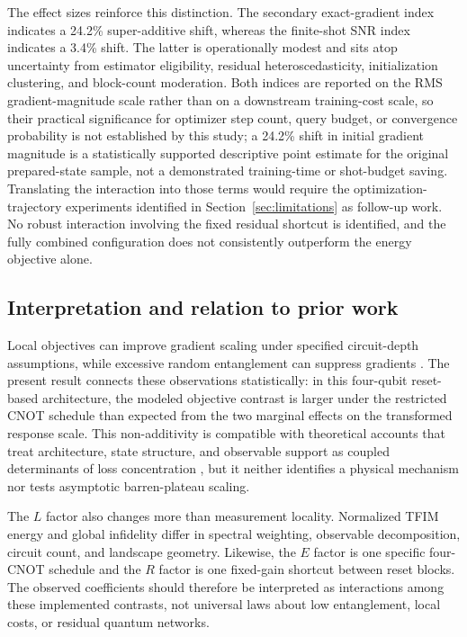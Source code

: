 \documentclass[pdflatex,sn-basic,Numbered]{sn-jnl}
\begin{document}
The effect sizes reinforce this distinction. The secondary exact-gradient index indicates a 24.2\% super-additive shift, whereas the finite-shot SNR index indicates a 3.4\% shift. The latter is operationally modest and sits atop uncertainty from estimator eligibility, residual heteroscedasticity, initialization clustering, and block-count moderation. Both indices are reported on the RMS gradient-magnitude scale rather than on a downstream training-cost scale, so their practical significance for optimizer step count, query budget, or convergence probability is not established by this study; a 24.2\% shift in initial gradient magnitude is a statistically supported descriptive point estimate for the original prepared-state sample, not a demonstrated training-time or shot-budget saving. Translating the interaction into those terms would require the optimization-trajectory experiments identified in Section~\ref{sec:limitations} as follow-up work. No robust interaction involving the fixed residual shortcut is identified, and the fully combined configuration does not consistently outperform the energy objective alone.

\subsection{Interpretation and relation to prior work}

Local objectives can improve gradient scaling under specified circuit-depth assumptions, while excessive random entanglement can suppress gradients \cite{cerezo2021costfunction,ortizmarrero2021entanglement,patti2021entanglement}. The present result connects these observations statistically: in this four-qubit reset-based architecture, the modeled objective contrast is larger under the restricted CNOT schedule than expected from the two marginal effects on the transformed response scale. This non-additivity is compatible with theoretical accounts that treat architecture, state structure, and observable support as coupled determinants of loss concentration \cite{ragone2024lie}, but it neither identifies a physical mechanism nor tests asymptotic barren-plateau scaling.

The $L$ factor also changes more than measurement locality. Normalized TFIM energy and global infidelity differ in spectral weighting, observable decomposition, circuit count, and landscape geometry. Likewise, the $E$ factor is one specific four-CNOT schedule and the $R$ factor is one fixed-gain shortcut between reset blocks. The observed coefficients should therefore be interpreted as interactions among these implemented contrasts, not universal laws about low entanglement, local costs, or residual quantum networks.
\end{document}
